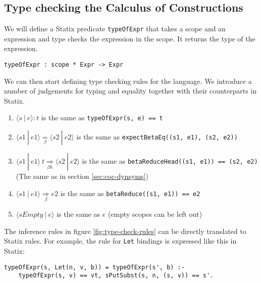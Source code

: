 \documentclass[a4paper,UKenglish,cleveref, autoref, thm-restate]{oasics-v2021}
\newcommand{\scope}[2]{\langle#1 \: | \: #2\rangle}
\newcommand{\bhr}[3]{ #1 \: #2 \underset{\beta h}{\Rightarrow} #3 }
\newcommand{\toe}[3]{ \scope{#1}{#2} : #3 }
\newcommand{\bred}[3]{ \scope{#1}{#2} \underset{\beta}{\Rightarrow} #3 }
\newcommand{\beq}[2]{ #1 \underset{\beta}{=} #2 }
\begin{document}
\subsection{Type checking the Calculus of Constructions}
\label{sec:coc-typecheck}

We will define a Statix predicate \verb|typeOfExpr| that takes a scope and an expression and type checks the expression in the scope. It returns the type of the expression.

\begin{lstlisting}
typeOfExpr : scope * Expr -> Expr
\end{lstlisting}
We can then start defining type checking rules for the language. We introduce a number of judgements for typing and equality together with their counterparts in Statix.
\begin{enumerate}
	\item $\toe{s}{e}{t}$ is the same as \verb|typeOfExpr(s, e) == t|
	\item $\beq{\scope{s1}{e1}}{\scope{s2}{e2}}$ is the same as \verb|expectBetaEq((s1, e1), (s2, e2))|
	\item $\bhr{\scope{s1}{e1}}{t}{\scope{s2}{e2}}$ is the same as \verb|betaReduceHead((s1, e1)) == (s2, e2)| \\ (The same as in section \ref{sec:coc-dynsyms})
	\item $\bred{s1}{e1}{e2}$ is the same as \verb|betaReduce((s1, e1)) == e2|
	\item $\scope{sEmpty}{e}$ is the same as $e$ (empty scopes can be left out)
\end{enumerate}

The inference rules in figure \ref{fig:type-check-rules} can be directly translated to Statix rules. For example, the rule for \verb|Let| bindings is expressed like this in Statix:
\begin{lstlisting}
typeOfExpr(s, Let(n, v, b)) = typeOfExpr(s', b) :-
    typeOfExpr(s, v) == vt, sPutSubst(s, n, (s, v)) == s'.
\end{lstlisting}
\end{document}
